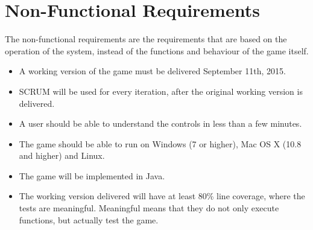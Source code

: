 \chapter{Non-Functional Requirements}

The non-functional requirements are the requirements that are based on the operation of the system, instead of the functions and behaviour of the game itself.

\begin{itemize}
\itemsep0em
	\item A working version of the game must be delivered September 11th, 2015.
	\item SCRUM will be used for every iteration, after the original working version is delivered.
	\item A user should be able to understand the controls in less than a few minutes.
	\item The game should be able to run on Windows (7 or higher), Mac OS X (10.8 and higher) and Linux.
	\item The game will be implemented in Java. 
	\item The working version delivered will have at least 80\% line coverage, where the tests are meaningful. Meaningful means that they do not only execute functions, but actually test the game.
\end{itemize}